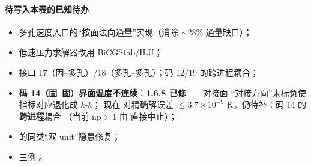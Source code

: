 \paragraph{待写入本表的已知待办}
\begin{itemize}
  \item 多孔速度入口的“按面法向通量”实现（消除 $\sim$28\% 通量缺口）；
  \item 低速压力求解器改用 BiCGStab/ILU；
  \item 接口 17（固--多孔）/18（多孔--多孔）；码 12/19 的跨进程耦合；
  \item \textbf{码 14（固--固）界面温度不连续}：\textbf{1.6.8 已修}——对接面
        “对接方向”未标负使指标对应退化成 $k$-$k$； 现在
        对精确解误差 $\le3.7\times10^{-9}$ K。仍待补：码 14 的\textbf{跨进程}耦合
        （当前 np$>$1 由  直接中止）；
  \item {} 的同类“双 unit”隐患修复；
  \item 三例 。
\end{itemize}
